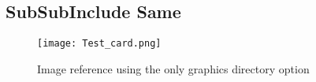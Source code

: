 \subsection{SubSubInclude Same}

\lipsum[8]


\begin{figure}%
    \centering
    \caption{Image reference using the only graphics directory option}
    \texttt{[image: Test\_card.png]}%
\end{figure}